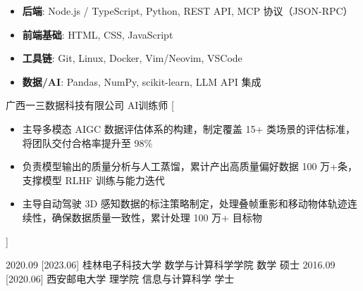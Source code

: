 \documentclass[zh]{resume}
\begin{document}
\begin{itemize}
    \item \textbf{后端}: Node.js / TypeScript, Python, REST API, MCP 协议（JSON-RPC）
    \item \textbf{前端基础}: HTML, CSS, JavaScript
    \item \textbf{工具链}: Git, Linux, Docker, Vim/Neovim, VSCode
    \item \textbf{数据/AI}: Pandas, NumPy, scikit-learn, LLM API 集成
\end{itemize}

\begin{experiences}
    {广西一三数据科技有限公司 \quad AI训练师}%
    [\begin{itemize}
      \item 主导多模态 AIGC 数据评估体系的构建，制定覆盖 15+ 类场景的评估标准，将团队交付合格率提升至 98\%
      \item 负责模型输出的质量分析与人工蒸馏，累计产出高质量偏好数据 100 万+条，支撑模型 RLHF 训练与能力迭代
      \item 主导自动驾驶 3D 感知数据的标注策略制定，处理叠帧重影和移动物体轨迹连续性，确保数据质量一致性，累计处理 100 万+ 目标物
    \end{itemize}]
\end{experiences}

\begin{educations}
  \education%
    {2020.09}%
    [2023.06]%
    {桂林电子科技大学}%
    {数学与计算科学学院}%
    {数学}%
    {硕士}
  \separator{0.2ex}
  \education%
    {2016.09}%
    [2020.06]%
    {西安邮电大学}%
    {理学院}%
    {信息与计算科学}%
    {学士}
\end{educations}
\end{document}
